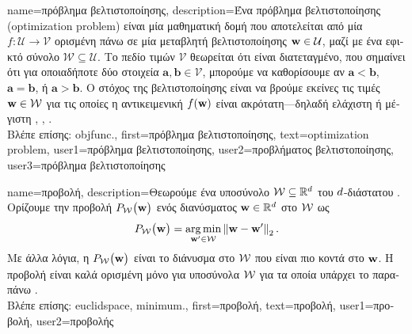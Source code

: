 {name={\foreignlanguage{greek}{πρόβλημα βελτιστοποίησης}}, 
	description={\foreignlanguage{greek}{Ένα πρόβλημα βελτιστοποίησης} 
		(optimization problem) \foreignlanguage{greek}{είναι μία μαθηματική δομή που αποτελείται από μία}  
		$f: \mathcal{U} \rightarrow \mathcal{V}$ \foreignlanguage{greek}{ορισμένη πάνω σε μία μεταβλητή βελτιστοποίησης 
		${\bf w} \in \mathcal{U}$, μαζί με ένα εφικτό σύνολο $\mathcal{W} \subseteq \mathcal{U}$. Το 
		πεδίο τιμών $\mathcal{V}$ θεωρείται ότι είναι διατεταγμένο, που σημαίνει ότι για οποιαδήποτε δύο στοιχεία 
		$\mathbf{a}, \mathbf{b} \in \mathcal{V}$, μπορούμε να καθορίσουμε αν $\mathbf{a} < \mathbf{b}$, $\mathbf{a} = \mathbf{b}$, 
		ή $\mathbf{a} > \mathbf{b}$. Ο στόχος της βελτιστοποίησης είναι να βρούμε εκείνες τις τιμές ${\bf w} \in \mathcal{W}$ 
		για τις οποίες η αντικειμενική $f({\bf w})$ είναι ακρότατη—δηλαδή ελάχιστη ή μέγιστη} 
		\cite{BertsekasNonLinProgr}, \cite{BoydConvexBook}, \cite{nesterov04}.\\
		\foreignlanguage{greek}{Βλέπε επίσης:} \gls{objfunc}.},
	first={\foreignlanguage{greek}{πρόβλημα βελτιστοποίησης}},
	text={optimization problem},
	user1={\foreignlanguage{greek}{πρόβλημα βελτιστοποίησης}}, %
  	user2={\foreignlanguage{greek}{προβλήματος βελτιστο\-ποί\-ησης}}, %
	user3={\foreignlanguage{greek}{πρόβλημα βελτιστοποίησης}} %
}

 {name={\foreignlanguage{greek}{προβολή}}, 
       description={\foreignlanguage{greek}{Θεωρούμε ένα υποσύνολο} $\mathcal{W} \subseteq \mathbb{R}^{d}$ 
       		\foreignlanguage{greek}{του $d$-διάστατου} . \foreignlanguage{greek}{Ορίζουμε την προβολή 
		$P_{\mathcal{W}}\big( {\bf w}\big)$ ενός διανύσματος ${\bf w} \in \mathbb{R}^{d}$ στο $\mathcal{W}$ ως}
		\begin{equation} 
   	    		\label{equ_def_proj_generic_dict}
  	     		P_{\mathcal{W}}\big( {\bf w}\big) = \operatorname*{arg\,min}_{{\bf w}' \in \mathcal{W}} \left\Vert {{\bf w}- {\bf w}'} \right\Vert_{2}. 
         	\end{equation}
		 \foreignlanguage{greek}{Με άλλα λόγια, η $P_{\mathcal{W}}\big( {\bf w}\big)$ είναι το διάνυσμα στο $\mathcal{W}$ που είναι 
		 πιο κοντά στο ${\bf w}$. Η προβολή είναι καλά ορισμένη μόνο για υποσύνολα $\mathcal{W}$ για τα οποία 
		 υπάρχει το παραπάνω}  \cite{BoydConvexBook}.\\
		 \foreignlanguage{greek}{Βλέπε επίσης:} \gls{euclidspace}, \gls{minimum}.},
	first={\foreignlanguage{greek}{προβολή}},
	text={\foreignlanguage{greek}{προβολή}},
	user1={\foreignlanguage{greek}{προβολή}}, %
	user2={\foreignlanguage{greek}{προβολής}} %
}

